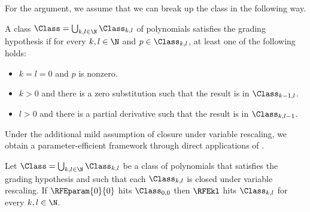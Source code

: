 \documentclass{toc}
\begin{document}
For the argument, we assume that we can break up the class in the following way.
\begin{definition}
A class $\Class = \bigcup_{k,l \in \N} \Class_{k,l}$ of polynomials satisfies the grading hypothesis if for every \(k,l \in \N\) and \(p\in \Class_{k,l}\),
at least one of the following holds:
\begin{itemize}
  \item \(k=l=0\) and \(p\) is nonzero.
  \item
    \(k > 0\) and there is a zero substitution such that the result is in
    \(\Class_{k-1,l}\).
  \item
    \(l > 0\) and there is a partial derivative such that the result is in
    \(\Class_{k,l-1}\).
\end{itemize}
\end{definition}
Under the additional mild assumption of closure under variable rescaling, we obtain a parameter-efficient framework through
direct applications of .
\begin{proposition}\label{prop.zsub-deriv-power}
Let $\Class = \bigcup_{k,l \in \N} \Class_{k,l}$ be a class of polynomials that satisfies the grading hypothesis and such that each $\Class_{k,l}$ is closed under variable rescaling. If $\RFEparam{0}{0}$ hits $\Class_{0,0}$ then 
\(\RFEkl\) hits \(\Class_{k,l}\) for every \(k,l \in \N\).
\end{proposition}
\end{document}

